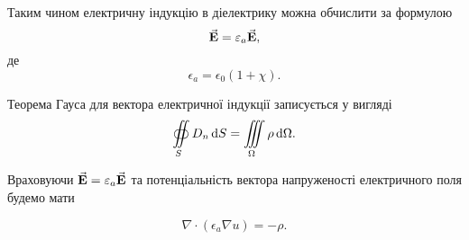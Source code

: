 Таким чином електричну індукцію в діелектрику можна обчислити за формулою 
\begin{equation}
	{\vec{\mathbf{E}}} = \varepsilon_a {\vec{\mathbf{E}}},
\end{equation}
де
\begin{equation}
	\epsilon_a = \epsilon_0 (1 + \chi).
\end{equation}

Теорема Гауса для вектора електричної індукції записується у вигляді
\begin{equation}
	\displaystyle\oiint\limits_S D_n \mathop{}\!\mathrm{d} S = \displaystyle\iiint\limits_\Omega \rho \mathop{}\!\mathrm{d} \Omega.
\end{equation}

Враховуючи ${\vec{\mathbf{E}}} = \varepsilon_a {\vec{\mathbf{E}}}$ та потенціальність вектора напруженості електричного поля будемо мати 
\begin{th_equation}
	\begin{equation}
		\nabla \cdot (\epsilon_a \nabla u) = - \rho.
	\end{equation}
\end{th_equation}

